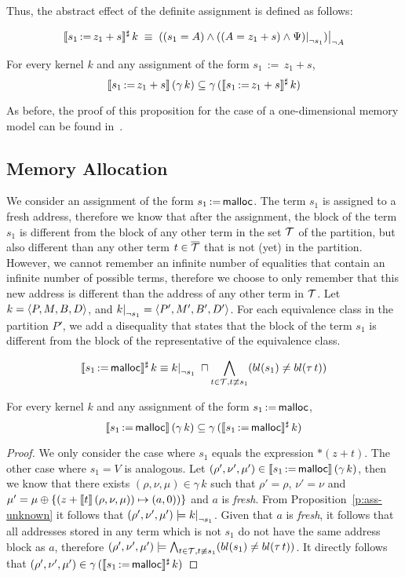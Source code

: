 Thus, the abstract effect of the definite assignment is defined as follows:

\[
	\sem{s_1\,{:=}\,z_1+s}^\sharp\,k\;\equiv\;
	\restr{((s_1=A)\land\restr{((A=z_1+s)\land\Psi)}{\neg s_1})}{\neg A}
\]

\begin{proposition}\label{p:ass-definite}
	For every kernel $k$ and any assignment of the form $s_1\,{:=}\,z_1+s$,
	\[
		\llbracket s_1\,{:=}\,z_1+s\rrbracket\,(\gamma\,k) \subseteq \gamma\,(\llbracket s_1\,{:=}\,z_1+s\rrbracket^\sharp\,k)
	\]
\end{proposition}

As before, the proof of this proposition for the case of a one-dimensional memory model can be found in~\cite{2pointer}.

\subsection{Memory Allocation}

We consider an assignment of the form $s_1\,{:=}\,\textsf{malloc}$.
The term $s_1$ is assigned to a fresh address, therefore we know that after the assignment,
the block of the term $s_1$ is different from the block of any other term in the set $\mathcal{T}$ of the partition,
but also different than any other term $t \in {\overline{\mathcal{T}}}$ that is not (yet) in the partition.
However, we cannot remember an infinite number of equalities that contain an infinite number of possible terms,
therefore we choose to only remember that this new address is different than the address of any other term in $\mathcal{T}$.
Let $k = \langle P, M, B,D\rangle$, and $\restr{k}{\neg s_1} = \angl{P', M', B', D'}$.
For each equivalence class in the partition $P'$, we add a disequality that states
that the block of the term $s_1$ is different from the block of the representative of the equivalence class.

\[
	\sem{s_1\,{:=}\,\text{\malloc}}^\sharp\,k \equiv
	\restr{k}{\neg s_1}\;\meet
	\bigwedge_{t\in \T, t \nequiv s_1}(bl(s_1) \neq bl(\tau\,t))
\]

\begin{proposition}\label{p:ass-malloc}
	For every kernel $k$ and any assignment of the form $s_1\,{:=}\,\textsf{malloc}$,
	\[
		\llbracket s_1\,{:=}\,\textsf{malloc}\rrbracket\,(\gamma\,k) \subseteq \gamma\,(\llbracket s_1\,{:=}\,\textsf{malloc}\rrbracket^\sharp\,k)
	\]
\end{proposition}

\begin{proof}
	We only consider the case where $s_1$ equals the expression $*(z+t)$.
	The other case where $s_1 = V$ is analogous.
	Let $(\rho',\nu',\mu') \in \llbracket s_1\,{:=}\,\textsf{malloc}\rrbracket\,(\gamma\,k)$, then we know that there exists $(\rho,\nu,\mu) \in \gamma\,k$ such that $\rho'=\rho$, $\nu'=\nu$ and $\mu' =\mu\oplus\{(z+\llbracket t\rrbracket\,(\rho,\nu,\mu))\mapsto (a,0))\}$ and $a$ is \emph{fresh}.
	From Proposition~\ref{p:ass-unknown} it follows that $(\rho',\nu',\mu') \models \restr{k}{\neg s_1}$.
	Given that $a$ is \emph{fresh}, it follows that all addresses stored in any term which is not $s_1$ do not have the same address block as $a$, therefore $(\rho',\nu',\mu') \models \bigwedge_{t\in \mathcal{T}, t \not\equiv s_1}(bl(s_1) \neq bl(\tau\,t))$.
	It directly follows that $(\rho',\nu',\mu') \in \gamma\,(\llbracket s_1\,{:=}\,\textsf{malloc}\rrbracket^\sharp\,k)$
\end{proof}

